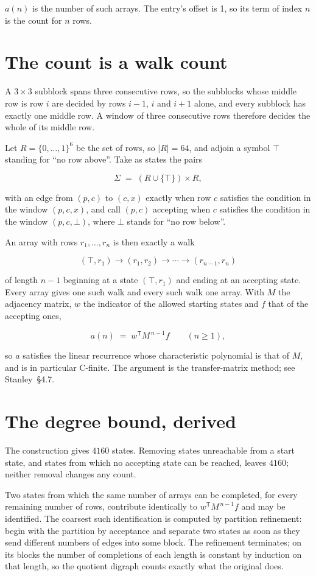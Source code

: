 \documentclass[11pt]{article}
\theoremstyle{definition}
\begin{document}
$a(n)$ is the number of such arrays. The entry's offset is 1, so its term of index $n$ is the count for $n$ rows.

\section{The count is a walk count}

A $3 \times 3$ subblock spans three consecutive rows, so the subblocks whose middle row is row $i$ are decided by rows $i-1$, $i$ and $i+1$ alone, and every subblock has exactly one middle row. A window of three consecutive rows therefore decides the whole of its middle row.

Let $R = \{0,\dots,1\}^{6}$ be the set of rows, so $|R| = 64$, and adjoin a symbol $\top$ standing for ``no row above''. Take as states the pairs

\[\Sigma \;=\; (R \cup \{\top\}) \times R,\]

with an edge from $(p,c)$ to $(c,x)$ exactly when row $c$ satisfies the condition in the window $(p,c,x)$, and call $(p,c)$ accepting when $c$ satisfies the condition in the window $(p,c,\bot)$, where $\bot$ stands for ``no row below''.

An array with rows $r_1,\dots,r_n$ is then exactly a walk

\[(\top,r_1) \to (r_1,r_2) \to \cdots \to (r_{n-1},r_n)\]

of length $n-1$ beginning at a state $(\top,r_1)$ and ending at an accepting state. Every array gives one such walk and every such walk one array. With $M$ the adjacency matrix, $w$ the indicator of the allowed starting states and $f$ that of the accepting ones,

\[a(n) \;=\; w^{\mathsf T} M^{\,n-1} f \qquad (n \ge 1),\]

so $a$ satisfies the linear recurrence whose characteristic polynomial is that of $M$, and is in particular C-finite. The argument is the transfer-matrix method; see Stanley~\S4.7.

\section{The degree bound, derived}

The construction gives $4160$ states. Removing states unreachable from a start state, and states from which no accepting state can be reached, leaves $4160$; neither removal changes any count.

Two states from which the same number of arrays can be completed, for every remaining number of rows, contribute identically to $w^{\mathsf T}M^{\,n-1}f$ and may be identified. The coarsest such identification is computed by partition refinement: begin with the partition by acceptance and separate two states as soon as they send different numbers of edges into some block. The refinement terminates; on its blocks the number of completions of each length is constant by induction on that length, so the quotient digraph counts exactly what the original does.
\end{document}
